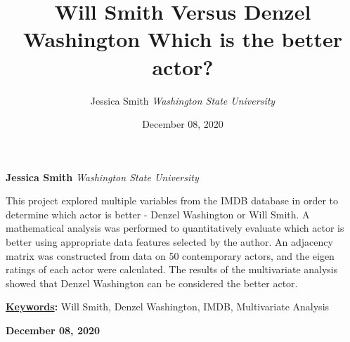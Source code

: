 \documentclass[]{article}
\title{\textbf{\textcolor{WSU.crimson}{Will Smith Versus Denzel
Washington}} \newline \textbf{\textcolor{WSU.gray}{Which is the better
actor?}}  }
\author{\Large Jessica
Smith\vspace{0.05in} \newline\normalsize\emph{Washington State
University}  }
\date{December 08, 2020}
\newcommand*{\authorfont}{\fontfamily{phv}\selectfont}
\renewenvironment{abstract}
 {{%
    \setlength{\leftmargin}{0mm}
    \setlength{\rightmargin}{\leftmargin}%
  }%
  \relax}
 {\endlist}
\begin{document}
	
%    


{%
\setlength{\parindent}{0pt}
\thispagestyle{plain}
{\fontsize{18}{20}\selectfont\raggedright 
\maketitle  %

}

{
   \vskip 13.5pt\relax \normalsize\fontsize{11}{12} 
   
\textbf{\authorfont Jessica Smith} \hskip 15pt \emph{\small Washington
State University}   

}

}








\begin{abstract}

    \hbox{\vrule height .2pt width 39.14pc}

    \vskip 8.5pt %

\noindent This project explored multiple variables from the IMDB
database in order to determine which actor is better - Denzel Washington
or Will Smith. A mathematical analysis was performed to quantitatively
evaluate which actor is better using appropriate data features selected
by the author. An adjacency matrix was constructed from data on 50
contemporary actors, and the eigen ratings of each actor were
calculated. The results of the multivariate analysis showed that Denzel
Washington can be considered the better actor.


\vskip 8.5pt \noindent \textbf{\underline{Keywords}:} Will Smith, Denzel
Washington, IMDB, Multivariate Analysis \par

    




    
    \hbox{\vrule height .2pt width 39.14pc}
    \vskip 5pt 
    \hfill \textbf{\textcolor{WSU.gray}{ December 08, 2020 } }
    \vskip 5pt 
    
\end{abstract}
\end{document}
